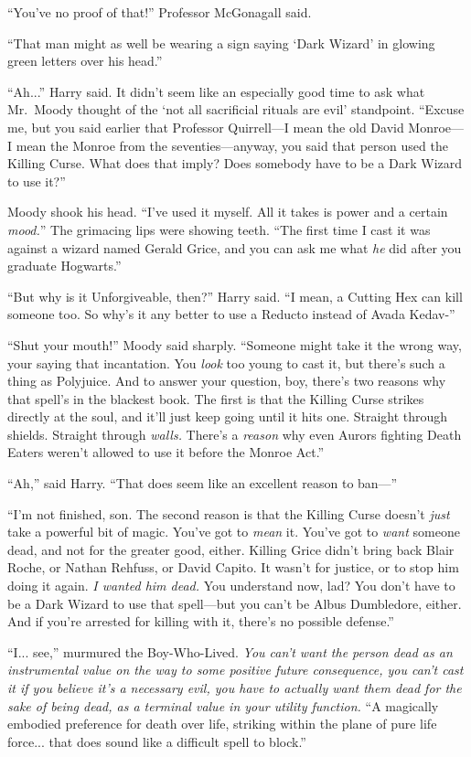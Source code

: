 “You’ve no proof of that!” Professor McGonagall said.

“That man might as well be wearing a sign saying ‘Dark Wizard’ in glowing green letters over his head.”

“Ah...” Harry said. It didn’t seem like an especially good time to ask what Mr.~Moody thought of the ‘not all sacrificial rituals are evil’ standpoint. “Excuse me, but you said earlier that Professor Quirrell—I mean the old David Monroe—I mean the Monroe from the seventies—anyway, you said that person used the Killing Curse. What does that imply? Does somebody have to be a Dark Wizard to use it?”

Moody shook his head. “I’ve used it myself. All it takes is power and a certain \emph{mood.}” The grimacing lips were showing teeth. “The first time I cast it was against a wizard named Gerald Grice, and you can ask me what \emph{he} did after you graduate Hogwarts.”

“But why is it Unforgiveable, then?” Harry said. “I mean, a Cutting Hex can kill someone too. So why’s it any better to use a Reducto instead of Avada Kedav-”

“Shut your mouth!” Moody said sharply. “Someone might take it the wrong way, your saying that incantation. You \emph{look} too young to cast it, but there’s such a thing as Polyjuice. And to answer your question, boy, there’s two reasons why that spell’s in the blackest book. The first is that the Killing Curse strikes directly at the soul, and it’ll just keep going until it hits one. Straight through shields. Straight through \emph{walls.} There’s a \emph{reason} why even Aurors fighting Death Eaters weren’t allowed to use it before the Monroe Act.”

“Ah,” said Harry. “That does seem like an excellent reason to ban—”

“I’m not finished, son. The second reason is that the Killing Curse doesn’t \emph{just} take a powerful bit of magic. You’ve got to \emph{mean} it. You’ve got to \emph{want} someone dead, and not for the greater good, either. Killing Grice didn’t bring back Blair Roche, or Nathan Rehfuss, or David Capito. It wasn’t for justice, or to stop him doing it again. \emph{I wanted him dead.} You understand now, lad? You don’t have to be a Dark Wizard to use that spell—but you can’t be Albus Dumbledore, either. And if you’re arrested for killing with it, there’s no possible defense.”

“I... see,” murmured the Boy-Who-Lived. \emph{You can’t want the person dead as an instrumental value on the way to some positive future consequence, you can’t cast it if you believe it’s a necessary evil, you have to actually want them dead for the sake of being dead, as a terminal value in your utility function.} “A magically embodied preference for death over life, striking within the plane of pure life force... that does sound like a difficult spell to block.”


